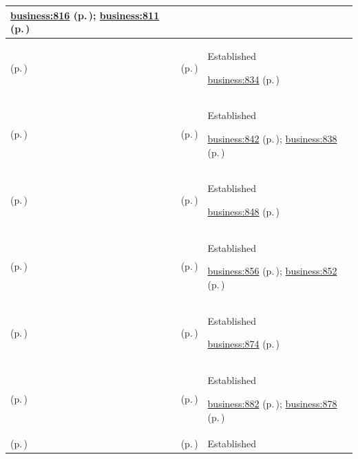 \begin{longtable}{|>{\raggedright\arraybackslash}p{0.27\TableWidth}|>{\raggedright\arraybackslash}p{0.27\TableWidth}|>{\raggedright\arraybackslash}p{0.46\TableWidth}|}
 \hyperref[rad:business:813]{business:816} (p.\,\pageref{rad:business:813}); \hyperref[rad:business:811]{business:811} (p.\,\pageref{rad:business:811})\\\hline
\nameref{cap:bc-health-research-innovation} (p.\,\pageref{cap:bc-health-research-innovation}) & \nameref{cap:bc-research-information-support} (p.\,\pageref{cap:bc-research-information-support}) & Established

 \hyperref[rad:business:834]{business:834} (p.\,\pageref{rad:business:834})\\\hline
\nameref{cap:bc-research-information-support} (p.\,\pageref{cap:bc-research-information-support}) & \nameref{cap:bc-governed-research-information-provision} (p.\,\pageref{cap:bc-governed-research-information-provision}) & Established

 \hyperref[rad:business:840]{business:842} (p.\,\pageref{rad:business:840}); \hyperref[rad:business:838]{business:838} (p.\,\pageref{rad:business:838})\\\hline
\nameref{cap:bc-health-research-innovation} (p.\,\pageref{cap:bc-health-research-innovation}) & \nameref{cap:bc-health-innovation} (p.\,\pageref{cap:bc-health-innovation}) & Established

 \hyperref[rad:business:848]{business:848} (p.\,\pageref{rad:business:848})\\\hline
\nameref{cap:bc-health-innovation} (p.\,\pageref{cap:bc-health-innovation}) & \nameref{cap:bc-health-innovation-evaluation} (p.\,\pageref{cap:bc-health-innovation-evaluation}) & Established

 \hyperref[rad:business:854]{business:856} (p.\,\pageref{rad:business:854}); \hyperref[rad:business:852]{business:852} (p.\,\pageref{rad:business:852})\\\hline
\nameref{cap:bc-health-service-direction-stewardship} (p.\,\pageref{cap:bc-health-service-direction-stewardship}) & \nameref{cap:bc-health-service-modelling} (p.\,\pageref{cap:bc-health-service-modelling}) & Established

 \hyperref[rad:business:874]{business:874} (p.\,\pageref{rad:business:874})\\\hline
\nameref{cap:bc-health-service-modelling} (p.\,\pageref{cap:bc-health-service-modelling}) & \nameref{cap:bc-health-service-need-identification} (p.\,\pageref{cap:bc-health-service-need-identification}) & Established

 \hyperref[rad:business:880]{business:882} (p.\,\pageref{rad:business:880}); \hyperref[rad:business:878]{business:878} (p.\,\pageref{rad:business:878})\\\hline
\nameref{cap:bc-health-service-modelling} (p.\,\pageref{cap:bc-health-service-modelling}) & \nameref{cap:bc-health-service-capability-identification} (p.\,\pageref{cap:bc-health-service-capability-identification}) & Established


\end{longtable}
